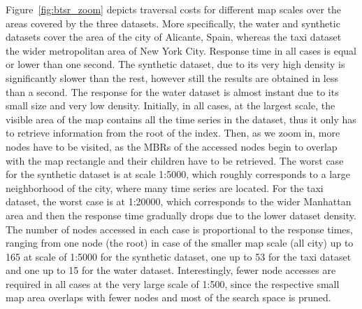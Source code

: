 Figure~\ref{fig:btsr_zoom} depicts traversal costs for different map scales over the areas covered by the three datasets. More specifically, the water and synthetic datasets cover the area of the city of Alicante, Spain, whereas the taxi dataset the wider metropolitan area of New York City. Response time in all cases is equal or lower than one second. The synthetic dataset, due to its very high density is significantly slower than the rest, however still the results are obtained in less than a second. The response for the water dataset is almost instant due to its small size and very low density. Initially, in all cases, at the largest scale, the visible area of the map contains all the time series in the dataset, thus it only has to retrieve information from the root of the index. Then, as we zoom in, more nodes have to be visited, as the MBRs of the accessed nodes begin to overlap with the map rectangle and their children have to be retrieved. The worst case for the synthetic dataset is at scale 1:5000, which roughly corresponds to a large neighborhood of the city, where many time series are located. For the taxi dataset, the worst case is at 1:20000, which corresponds to the wider Manhattan area and then the response time gradually drops due to the lower dataset density. The number of nodes accessed in each case is proportional to the response times, ranging from one node (the root) in case of the smaller map scale (all city) up to 165 at scale of 1:5000 for the synthetic dataset, one up to 53 for the taxi dataset and one up to 15 for the water dataset. Interestingly, fewer node accesses are required in all cases at the very large scale of 1:500, since the respective small map area overlaps with fewer nodes and most of the search space is pruned. 


